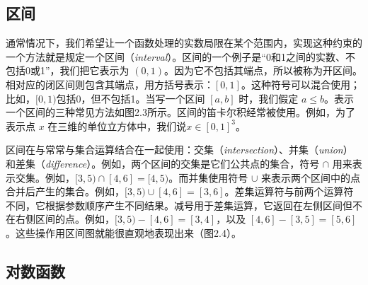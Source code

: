 \documentclass[lang=cn,12pt,marginpar=margintrue]{elegantbook}
\begin{document}
\subsection{区间}

通常情况下，我们希望让一个函数处理的实数局限在某个范围内，实现这种约束的一个方法就是规定一个区间（\textit{interval}）。区间的一个例子是“0和1之间的实数、不包括0或1”，我们把它表示为 $(0,1)$。因为它不包括其端点，所以被称为开区间。相对应的闭区间则包含其端点，用方括号表示：$[0,1]$。这种符号可以混合使用；比如，$[0,1)$包括0，但不包括1。当写一个区间 $[a,b]$ 时，我们假定 $a \leq b$。表示一个区间的三种常见方法如图2.3所示。区间的笛卡尔积经常被使用。例如，为了表示点 $x$ 在三维的单位立方体中，我们说$x \in [0, 1]^3$。


区间在与常常与集合运算结合在一起使用：交集（\textit{intersection}）、并集（\textit{union}）和差集（\textit{difference}）。例如，两个区间的交集是它们公共点的集合，符号 $\cap$ 用来表示交集。例如，$[3,5) \cap [4,6] = [4,5)$。而并集使用符号 $\cup$ 来表示两个区间中的点合并后产生的集合。例如，$[3,5) \cup [4,6] = [3,6]$。差集运算符与前两个运算符不同，它根据参数顺序产生不同结果。减号用于差集运算，它返回在左侧区间但不在右侧区间的点。例如，$[3,5) - [4,6] = [3,4]$，以及 $[4,6] - [3,5] = [5,6]$。这些操作用区间图就能很直观地表现出来（图2.4）。

\marginpar{
  \begin{center}
    \texttt{[image: 2.4.png]}
    \captionof{figure}{在 $[3,5)$ 和 $[4,6]$ 上的区间操作。}
  \end{center}
}

\subsection{对数函数}
\end{document}
